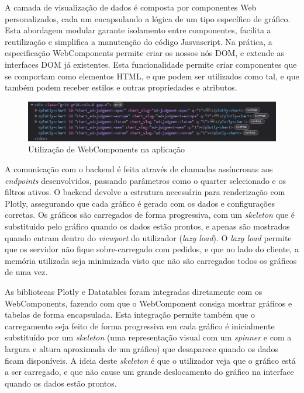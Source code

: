 A camada de visualização de dados é composta por componentes Web personalizados, cada um encapsulando a lógica de um tipo específico de gráfico. Esta abordagem modular garante isolamento entre componentes, facilita a reutilização e simplifica a manutenção do código Jasvascript. Na prática, a especificação WebComponents\cite{webcomponents} permite criar os nossos nós DOM, e extende as interfaces DOM já existentes. Esta funcionalidade permite criar componentes que se comportam como elementos HTML, e que podem ser utilizados como tal, e que também podem receber estilos e outras propriedades e atributos. 

\begin{figure}[H]
    \centering
    \includegraphics[width=\textwidth]{./img/webc}
 \caption{Utilização de WebComponents na aplicação}
 \end{figure}

A comunicação com o backend é feita através de chamadas assíncronas aos \textit{endpoints} desenvolvidos, passando parâmetros como o quarter selecionado e os filtros ativos. O backend devolve a estrutura necessária para renderização com Plotly, assegurando que cada gráfico é gerado com os dados e configurações corretas. Os gráficos são carregados de forma progressiva, com um \textit{skeleton} que é substituido pelo gráfico quando os dados estão prontos, e apenas são mostrados quando entram dentro do \textit{viewport} do utilizador (\textit{lazy load}). O \textit{lazy load} permite que os servidor não fique sobre-carregado com pedidos, e que no lado do cliente, a memória utilizada seja minimizada visto que não são carregados todos os gráficos de uma vez.	

As bibliotecas Plotly e Datatables foram integradas diretamente com os WebComponents\cite{webcomponents}, fazendo com que o WebComponent consiga mostrar gráficos e tabelas de forma encapsulada. Esta integração permite também que o carregamento seja feito de forma progressiva em cada gráfico é inicialmente substituído por um \textit{skeleton} (uma representação visual com um \textit{spinner} e com a largura e altura aproximada de um gráfico) que desaparece quando os dados ficam disponíveis. A ideia deste \textit{skeleton} é que o utilizador veja que o gráfico está a ser carregado, e que não cause um grande deslocamento do gráfico na interface quando os dados estão prontos.

